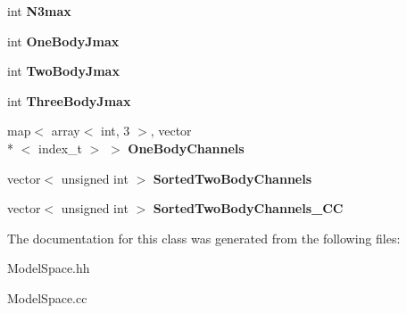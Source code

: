 \begin{DoxyCompactItemize}
\item 
\hypertarget{classModelSpace_ab28d5ba1838ef9d91a3f7c570530ca7c}{int {\bfseries N3max}}\label{classModelSpace_ab28d5ba1838ef9d91a3f7c570530ca7c}

\item 
\hypertarget{classModelSpace_a4c8f0a4476a3b3da3fced59d899f0134}{int {\bfseries One\-Body\-Jmax}}\label{classModelSpace_a4c8f0a4476a3b3da3fced59d899f0134}

\item 
\hypertarget{classModelSpace_aa2fd94965eb8a508e5ea7d4c879bae0b}{int {\bfseries Two\-Body\-Jmax}}\label{classModelSpace_aa2fd94965eb8a508e5ea7d4c879bae0b}

\item 
\hypertarget{classModelSpace_af9ca130d96f582d0ed1a4ef5373bcd05}{int {\bfseries Three\-Body\-Jmax}}\label{classModelSpace_af9ca130d96f582d0ed1a4ef5373bcd05}

\item 
\hypertarget{classModelSpace_add00e0a37f8597748f903dffb1c5b2a5}{map$<$ array$<$ int, 3 $>$, vector\\*
$<$ index\-\_\-t $>$ $>$ {\bfseries One\-Body\-Channels}}\label{classModelSpace_add00e0a37f8597748f903dffb1c5b2a5}

\item 
\hypertarget{classModelSpace_aaea26da5a75b807edc787f99ac7df922}{vector$<$ unsigned int $>$ {\bfseries Sorted\-Two\-Body\-Channels}}\label{classModelSpace_aaea26da5a75b807edc787f99ac7df922}

\item 
\hypertarget{classModelSpace_a9707a32e9f56698cd10cece2843f1478}{vector$<$ unsigned int $>$ {\bfseries Sorted\-Two\-Body\-Channels\-\_\-\-C\-C}}\label{classModelSpace_a9707a32e9f56698cd10cece2843f1478}

\end{DoxyCompactItemize}


The documentation for this class was generated from the following files\-:\begin{DoxyCompactItemize}
\item 
Model\-Space.\-hh\item 
Model\-Space.\-cc\end{DoxyCompactItemize}
